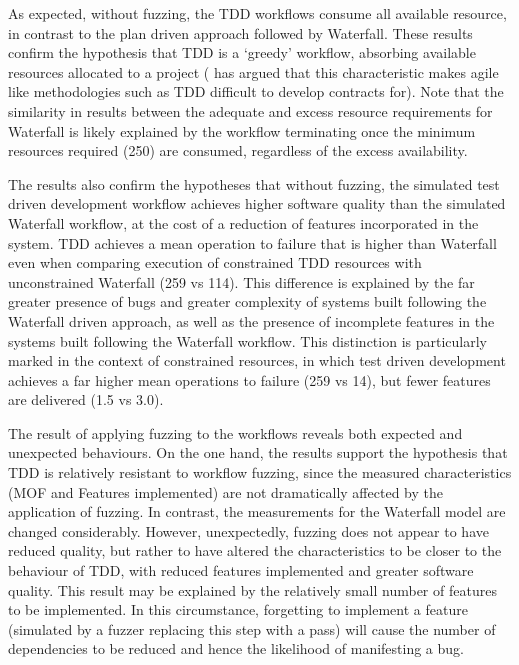 \documentclass{sig-alternate}
\begin{document}
As expected, without fuzzing, the TDD workflows consume all available resource,
in contrast to the plan driven approach followed by Waterfall.  These results
confirm the hypothesis that TDD is a `greedy' workflow, absorbing available
resources allocated to a project (\citet{sommerville10software} has argued that
this characteristic makes agile like methodologies such as TDD difficult to
develop contracts for).  Note that the similarity in results between the
adequate and excess resource requirements for Waterfall is likely explained by
the workflow terminating once the minimum resources required (250) are consumed,
regardless of the excess availability.

The results also confirm the hypotheses that without fuzzing, the simulated test
driven development workflow achieves higher software quality than the simulated
Waterfall workflow, at the cost of a reduction of features incorporated in the
system.  TDD achieves a mean operation to failure that is higher than Waterfall
even when comparing execution of constrained TDD resources with unconstrained
Waterfall (259 vs 114).  This difference is explained by the far greater
presence of bugs and greater complexity of systems built following the Waterfall
driven approach, as well as the presence of incomplete features in the systems
built following the Waterfall workflow.  This distinction is particularly marked
in the context of constrained resources, in which test driven development
achieves a far higher mean operations to failure (259 vs 14), but fewer features
are delivered (1.5 vs 3.0).

The result of applying fuzzing to the workflows reveals both expected and
unexpected behaviours.  On the one hand, the results support the hypothesis that
TDD is relatively resistant to workflow fuzzing, since the
measured characteristics (MOF and Features implemented) are not dramatically
affected by the application of fuzzing.  In contrast, the measurements for the
Waterfall model are changed considerably.  However, unexpectedly, fuzzing does
not appear to have reduced quality, but rather to have altered the
characteristics to be closer to the behaviour of TDD, with
reduced features implemented and greater software quality.  This result may be
explained by the relatively small number of features to be implemented.  In this
circumstance, forgetting to implement a feature (simulated by a fuzzer replacing
this step with a pass) will cause the number of dependencies to be reduced and
hence the likelihood of manifesting a bug.
\end{document}

